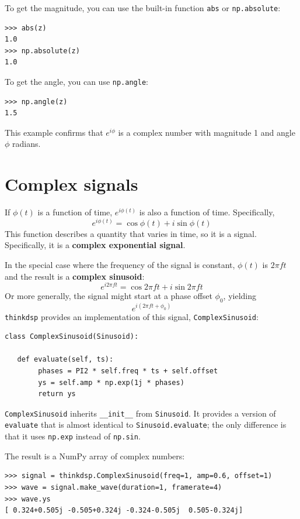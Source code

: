 \documentclass[12pt]{book}
\begin{document}
To get the magnitude, you can use the built-in function {\tt abs}
or {\tt np.absolute}:

\begin{verbatim}
>>> abs(z)
1.0
>>> np.absolute(z)
1.0
\end{verbatim}

To get the angle, you can use {\tt np.angle}:

\begin{verbatim}
>>> np.angle(z)
1.5
\end{verbatim}

This example confirms that $e^{i \phi}$ is a complex number with
magnitude 1 and angle $\phi$ radians.


\section{Complex signals}

If $\phi(t)$ is a function of time, $e^{i \phi(t)}$ is also a function
of time.  Specifically,
%
\[ e^{i \phi(t)} = \cos \phi(t) + i \sin \phi(t) \]
%
This function describes a quantity that varies in time, so it is
a signal.  Specifically, it is a {\bf complex exponential signal}.

In the special case where the frequency of the signal is constant,
$\phi(t)$ is $2 \pi f t$ and the result is a {\bf complex sinusoid}:
%
\[ e^{i 2 \pi f t} = \cos 2 \pi f t + i \sin 2 \pi f t \]
%
Or more generally, the signal might start at a phase offset
$\phi_0$, yielding
%
\[ e^{i (2 \pi f t + \phi_0)} \]
%
{\tt thinkdsp} provides an implementation of this signal,
{\tt ComplexSinusoid}:

\begin{verbatim}
class ComplexSinusoid(Sinusoid):

   def evaluate(self, ts):
        phases = PI2 * self.freq * ts + self.offset
        ys = self.amp * np.exp(1j * phases)
        return ys
\end{verbatim}

{\tt ComplexSinusoid} inherits \verb"__init__" from
{\tt Sinusoid}.  It provides a version of {\tt evaluate}
that is almost identical to {\tt Sinusoid.evaluate}; the
only difference is that it uses {\tt np.exp} instead of
{\tt np.sin}.

The result is a NumPy array of complex numbers:

\begin{verbatim}
>>> signal = thinkdsp.ComplexSinusoid(freq=1, amp=0.6, offset=1)
>>> wave = signal.make_wave(duration=1, framerate=4)
>>> wave.ys
[ 0.324+0.505j -0.505+0.324j -0.324-0.505j  0.505-0.324j]
\end{verbatim}
\end{document}
